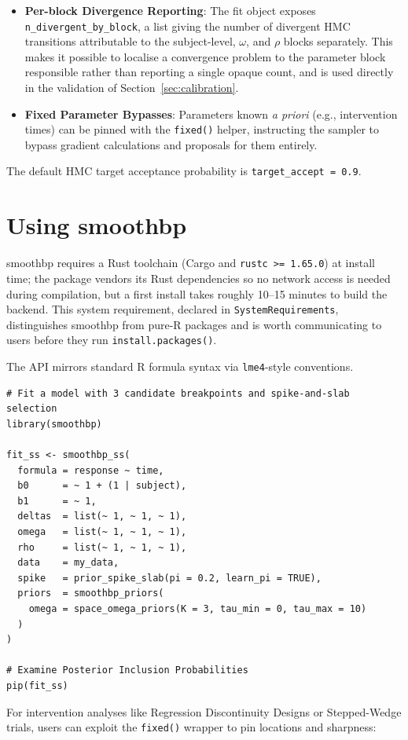 \documentclass[12pt]{article}
\newcommand{\pkg}[1]{\textsf{#1}}
\newcommand{\code}[1]{\texttt{#1}}
\begin{document}
\begin{itemize}
    \item \textbf{Per-block Divergence Reporting}: The fit object exposes \code{n\_divergent\_by\_block}, a list giving the number of divergent HMC transitions attributable to the subject-level, $\omega$, and $\rho$ blocks separately. This makes it possible to localise a convergence problem to the parameter block responsible rather than reporting a single opaque count, and is used directly in the validation of Section~\ref{sec:calibration}.
    \item \textbf{Fixed Parameter Bypasses}: Parameters known \emph{a priori} (e.g., intervention times) can be pinned with the \code{fixed()} helper, instructing the sampler to bypass gradient calculations and proposals for them entirely.
\end{itemize}

The default HMC target acceptance probability is \code{target\_accept = 0.9}.

\section{Using smoothbp}

\pkg{smoothbp} requires a Rust toolchain (Cargo and \code{rustc >= 1.65.0}) at install time; the package vendors its Rust dependencies so no network access is needed during compilation, but a first install takes roughly 10--15 minutes to build the backend. This system requirement, declared in \code{SystemRequirements}, distinguishes \pkg{smoothbp} from pure-R packages and is worth communicating to users before they run \code{install.packages()}.

The API mirrors standard R formula syntax via \code{lme4}-style conventions.

\begin{verbatim}
# Fit a model with 3 candidate breakpoints and spike-and-slab selection
library(smoothbp)

fit_ss <- smoothbp_ss(
  formula = response ~ time,
  b0      = ~ 1 + (1 | subject),
  b1      = ~ 1,
  deltas  = list(~ 1, ~ 1, ~ 1),
  omega   = list(~ 1, ~ 1, ~ 1),
  rho     = list(~ 1, ~ 1, ~ 1),
  data    = my_data,
  spike   = prior_spike_slab(pi = 0.2, learn_pi = TRUE),
  priors  = smoothbp_priors(
    omega = space_omega_priors(K = 3, tau_min = 0, tau_max = 10)
  )
)

# Examine Posterior Inclusion Probabilities
pip(fit_ss)
\end{verbatim}

For intervention analyses like Regression Discontinuity Designs or Stepped-Wedge trials, users can exploit the \code{fixed()} wrapper to pin locations and sharpness:
\end{document}
